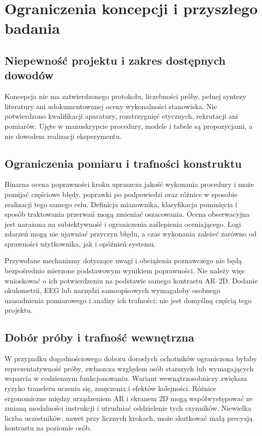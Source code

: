 \documentclass[11pt,a4paper]{article}
\begin{document}
\section{Ograniczenia koncepcji i przyszłego badania}
\subsection{Niepewność projektu i zakres dostępnych dowodów}
Koncepcja nie ma zatwierdzonego protokołu, liczebności próby, pełnej syntezy literatury ani udokumentowanej oceny wykonalności stanowiska. Nie potwierdzono kwalifikacji aparatury, rozstrzygnięć etycznych, rekrutacji ani pomiarów. Ujęte w manuskrypcie procedury, modele i tabele są propozycjami, a nie dowodem realizacji eksperymentu.

\subsection{Ograniczenia pomiaru i trafności konstruktu}
Binarna ocena poprawności kroku upraszcza jakość wykonania procedury i może pomijać częściowe błędy, poprawki po podpowiedzi oraz różnice w sposobie realizacji tego samego celu. Definicja mianownika, klasyfikacja pominięcia i sposób traktowania przerwań mogą zmieniać oszacowania. Ocena obserwacyjna jest narażona na subiektywność i ograniczenia zaślepienia oceniającego. Logi zdarzeń mogą nie ujawniać przyczyn błędu, a czas wykonania zależeć zarówno od sprawności użytkownika, jak i opóźnień systemu.

Przywołane mechanizmy dotyczące uwagi i obciążenia poznawczego nie będą bezpośrednio mierzone podstawowym wynikiem poprawności. Nie należy więc wnioskować o ich potwierdzeniu na podstawie samego kontrastu AR--2D. Dodanie okulometrii, EEG lub narzędzi samoopisowych wymagałoby osobnego uzasadnienia pomiarowego i analizy ich trafności; nie jest domyślną częścią tego projektu.

\subsection{Dobór próby i trafność wewnętrzna}
W przypadku dogodnościowego doboru dorosłych ochotników ograniczona byłaby reprezentatywność próby, zwłaszcza względem osób starszych lub wymagających wsparcia w codziennym funkcjonowaniu. Wariant wewnątrzosobniczy zwiększa ryzyko transferu uczenia się, zmęczenia i efektów kolejności. Różnice ergonomiczne między urządzeniem AR i ekranem 2D mogą współwystępować ze zmianą modalności instrukcji i utrudniać oddzielenie tych czynników. Niewielka liczba uczestników, nawet przy licznych krokach, może skutkować małą precyzją kontrastu na poziomie osób.
\end{document}
